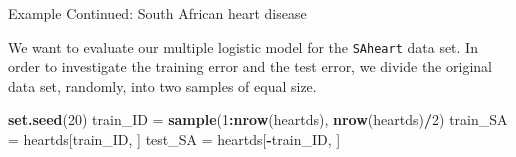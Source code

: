\documentclass[10pt,ignorenonframetext,]{beamer}
\newenvironment{Shaded}{\begin{snugshade}}{\end{snugshade}}
\newcommand{\KeywordTok}[1]{\textcolor[rgb]{0.13,0.29,0.53}{\textbf{#1}}}
\newcommand{\DecValTok}[1]{\textcolor[rgb]{0.00,0.00,0.81}{#1}}
\newcommand{\StringTok}[1]{\textcolor[rgb]{0.31,0.60,0.02}{#1}}
\newcommand{\OperatorTok}[1]{\textcolor[rgb]{0.81,0.36,0.00}{\textbf{#1}}}
\newcommand{\NormalTok}[1]{#1}
\begin{document}
\begin{frame}[fragile]

\begin{block}{Example Continued: South African heart disease}

We want to evaluate our multiple logistic model for the \texttt{SAheart}
data set. In order to investigate the training error and the test error,
we divide the original data set, randomly, into two samples of equal
size.

\begin{Shaded}
\begin{Highlighting}[]
\KeywordTok{set.seed}\NormalTok{(}\DecValTok{20}\NormalTok{)}
\NormalTok{train_ID =}\StringTok{ }\KeywordTok{sample}\NormalTok{(}\DecValTok{1}\OperatorTok{:}\KeywordTok{nrow}\NormalTok{(heartds), }\KeywordTok{nrow}\NormalTok{(heartds)}\OperatorTok{/}\DecValTok{2}\NormalTok{)}
\NormalTok{train_SA =}\StringTok{ }\NormalTok{heartds[train_ID, ]}
\NormalTok{test_SA =}\StringTok{ }\NormalTok{heartds[}\OperatorTok{-}\NormalTok{train_ID, ]}
\end{Highlighting}
\end{Shaded}

\end{block}

\end{frame}
\end{document}
